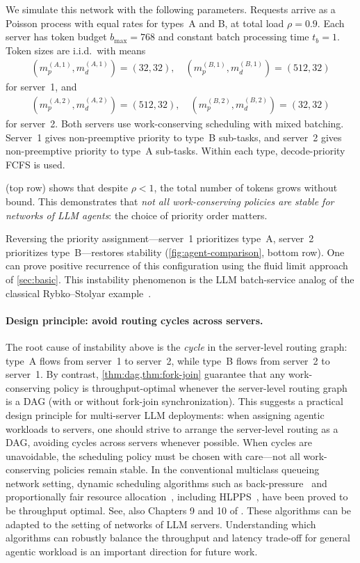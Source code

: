 \documentclass[11pt]{article}
\theoremstyle{plain}
\theoremstyle{definition}
\theoremstyle{remark}
\begin{document}
We simulate this network with the following parameters. Requests arrive as a Poisson process with equal rates for types~A and B, at total load $\rho = 0.9$. Each server has token budget $b_{\max} = 768$ and constant batch processing time $t_b = 1$. Token sizes are i.i.d.\ with means
\begin{align}
  \label{eq:agent1}
  (m^{(A,1)}_{p}, m^{(A,1)}_d)=(32,32), \quad (m^{(B,1)}_{p}, m^{(B,1)}_d)=(512,32)
\end{align}
for server~1, and
\begin{align}
  \label{eq:agent2}
  (m^{(A,2)}_{p}, m^{(A,2)}_d)=(512,32), \quad (m^{(B,2)}_{p}, m^{(B,2)}_d)=(32,32)
\end{align}
for server~2. Both servers use work-conserving scheduling with mixed batching. Server~1 gives non-preemptive priority to type~B sub-tasks, and server~2 gives non-preemptive priority to type~A sub-tasks. Within each type, decode-priority FCFS is used.

 (top row) shows that despite $\rho < 1$, the total number of tokens grows without bound. This demonstrates that \emph{not all work-conserving policies are stable for networks of LLM agents}: the choice of priority order matters.

Reversing the priority assignment---server~1 prioritizes type~A, server~2 prioritizes type~B---restores stability (\cref{fig:agent-comparison}, bottom row). One can prove positive recurrence of this configuration using the fluid limit approach of \cref{sec:basic}. This instability phenomenon is the LLM batch-service analog of the classical Rybko--Stolyar example~\citep{rybko1992ergodicity,dai2020processing}.

\paragraph{Design principle: avoid routing cycles across servers.}
The root cause of instability above is the \emph{cycle} in the server-level routing graph: type~A flows from server~1 to server~2, while type~B flows from server~2 to server~1. By contrast, \cref{thm:dag,thm:fork-join} guarantee that any work-conserving policy is throughput-optimal whenever the server-level routing graph is a DAG (with or without fork-join synchronization). This suggests a practical design principle for multi-server LLM deployments: when assigning agentic workloads to servers, one should strive to arrange the server-level routing as a DAG, avoiding cycles across servers whenever possible. When cycles are unavoidable, the scheduling policy must be chosen with care---not all work-conserving policies remain stable. In the conventional multiclass queueing network setting, dynamic scheduling algorithms such as back-pressure~\citep{tassiulas1990stability} and proportionally fair resource allocation~\citep{kelly1997charging,kelly1998rate}, including HLPPS~\citep{bramson1996convergence}, have been proved to be throughput optimal. See, also Chapters 9 and 10 of \cite{dai2020processing}.  These algorithms can be adapted to the setting of 
networks of LLM servers.  Understanding which algorithms can robustly balance the  throughput and latency trade-off  for general agentic workload  is an important direction for future work.
\end{document}
